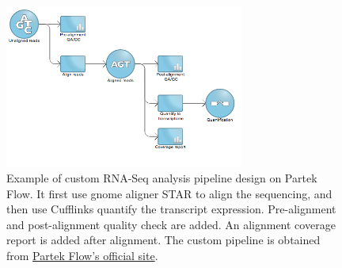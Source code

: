 \begin{figure}[!htbp]
\centering
\includegraphics[width=0.7\textwidth]{images/partek_flow_pipeline}
\caption[Example of custom pipeline design on Partek Flow]{
    Example of custom RNA-Seq analysis pipeline design on Partek Flow. It first
    use gnome aligner STAR to align the sequencing, and then use Cufflinks
    quantify the transcript expression. Pre-alignment and post-alignment
    quality check are added. An alignment coverage report is added after
    alignment. The custom pipeline is obtained from
    \href{http://www.partek.com/star-align-and-quantify}{Partek Flow's official site}.
}
\label{fig:partek-flow-pipeline}
\end{figure}


